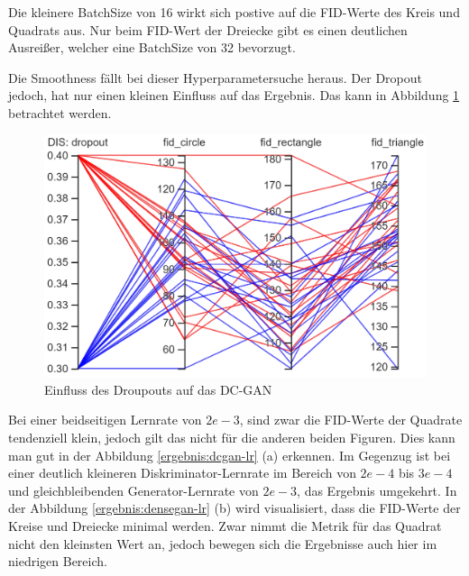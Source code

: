 Die kleinere BatchSize von 16 wirkt sich postive auf die FID-Werte des Kreis und Quadrats aus.
Nur beim FID-Wert der Dreiecke gibt es einen deutlichen Ausreißer, welcher eine BatchSize von 32 bevorzugt.
\newline

Die Smoothness fällt bei dieser Hyperparametersuche heraus.
Der Dropout jedoch, hat nur einen kleinen Einfluss auf das Ergebnis. 
Das kann in Abbildung \ref{ergebnis:dcgan-hyper-dropout} betrachtet werden.

\begin{figure}[H]
	\centering
	\includegraphics[width=0.5\textheight]{kapitel/5_ergebnisse/dcgan/hyperparameter_droupout.PNG}
	\caption{Einfluss des Droupouts auf das DC-GAN}
	\label{ergebnis:dcgan-hyper-dropout}
\end{figure}

Bei einer beidseitigen Lernrate von \(2e-3\), sind zwar die FID-Werte der Quadrate tendenziell klein, jedoch gilt das nicht für die anderen beiden Figuren.
Dies kann man gut in der Abbildung \ref{ergebnis:dcgan-lr} (a) erkennen.
Im Gegenzug ist bei einer deutlich kleineren Diskriminator-Lernrate im Bereich von \(2e-4\) bis \(3e-4\) und gleichbleibenden Generator-Lernrate von \(2e-3\), das Ergebnis umgekehrt.
In der Abbildung \ref{ergebnis:densegan-lr} (b) wird visualisiert, dass die FID-Werte der Kreise und Dreiecke minimal werden.
Zwar nimmt die Metrik für das Quadrat nicht den kleinsten Wert an, jedoch bewegen sich die Ergebnisse auch hier im niedrigen Bereich. 

